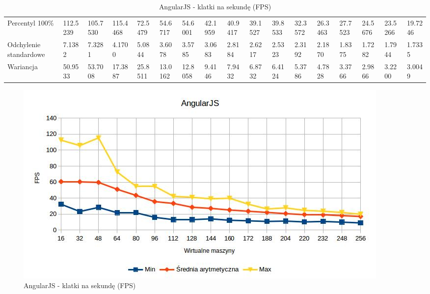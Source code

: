 \documentclass[polish, twoside, 12pt]{mwart}
\begin{document}
\begin{table}[]
{\begin{tabular}{@{}lllllllllllllllll@{}}
  Percentyl 100\%        & 112.5239 & 105.7530 & 115.4468 & 72.5479 & 54.6717 & 54.6001 & 42.1959 & 40.9417 & 39.1527 & 39.8533 & 32.3572 & 26.3463 & 27.7523 & 24.5676 & 23.5266 & 19.7246 \\
  Odchylenie standardowe & 7.1382   & 7.3281   & 4.1700   & 5.0844  & 3.6078  & 3.5785  & 3.0683  & 2.8184  & 2.6217  & 2.5323  & 2.3192  & 2.1870  & 1.8375  & 1.7282  & 1.7944  & 1.7335  \\
  Wariancja              & 50.9533  & 53.7008  & 17.3887  & 25.8511 & 13.0162 & 12.8058 & 9.4146  & 7.9432  & 6.8732  & 6.4124  & 5.3786  & 4.7828  & 3.3766  & 2.9866  & 3.2200  & 3.0049  \\ \bottomrule
  \end{tabular}%
  }
  \caption{AngularJS - klatki na sekundę (FPS)}
  \label{tab:angularjs-fps}
\end{table}

\begin{figure}[ht]
  \includegraphics[width=\textwidth]{angularjs-fps.jpg}
  \caption{AngularJS - klatki na sekundę (FPS)}
  \label{fig:angularjs-fps}
\end{figure}
\end{document}
